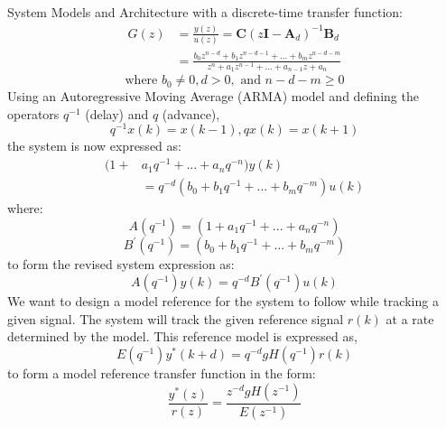\begin{section}{System Models and Architecture}
with a discrete-time transfer function:
	\begin{align}
        G(z) & = \frac{y(z)}{u(z)} = \bm{C}(z\bm{I}-\bm{A}_d)^{-1}\bm{B}_d  \\
	& = \frac{b_0z^{n-d}+b_1z^{n-d-1} +...+b_mz^{n-d-m}}{z^{n}+a_1z^{n-1}+...+a_{n-1}z+a_n} \nonumber
	\end{align}
	\begin{equation}
	\text{where } b_0\ne{0}, d>0, \text{ and } n-d-m\geq{0} \nonumber
	\end{equation}
Using an Autoregressive Moving Average (ARMA) model and defining the operators $q^{-1}$ (delay) and $q$ (advance),
	\begin{equation}
	q^{-1}x(k) = x(k-1), qx(k) = x(k+1)
	\end{equation}
the system is now expressed as:
    \begin{align}
	(1+&a_1q^{-1}+...+a_nq^{-n})y(k) \nonumber \\
	&=q^{-d}(b_0+b_1q^{-1}+...+b_mq^{-m})u(k)
	\end{align}
where:
	\begin{equation}
	A(q^{-1})=(1+a_1q^{-1}+...+a_nq^{-n}) \nonumber
	\end{equation}
	\begin{equation}
	B^{'}(q^{-1})=(b_0+b_1q^{-1}+...+b_mq^{-m}) \nonumber
	\end{equation}
to form the revised system expression as:
	\begin{equation}
	A(q^{-1})y(k)=q^{-d}B^{'}(q^{-1})u(k)
	\end{equation}
We want to design a model reference for the system to follow while tracking a given signal. The system will track the given reference signal $r(k)$ at a rate determined by the model. This reference model is expressed as,
	\begin{equation}
	E(q^{-1})y^*(k+d)=q^{-d}gH(q^{-1})r(k)
	\end{equation}
to form a model reference transfer function in the form:
	\begin{equation}
	\frac{y^*(z)}{r(z)}=\frac{z^{-d}gH(z^{-1})}{E(z^{-1})}
	\end{equation}

\end{section}